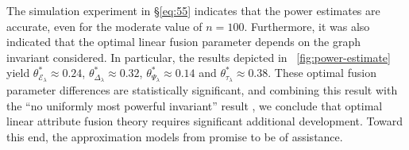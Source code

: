 \documentclass[10pt,journal,compsoc]{IEEEtran}
\theoremstyle{definition}
\begin{document}
The simulation experiment in \S \ref{eq:55} indicates that the power estimates
are accurate, even for the moderate value of $n = 100$. Furthermore,
it was also indicated that the optimal linear fusion parameter depends
on the graph invariant considered. In particular, the results depicted
in \figurename~\ref{fig:power-estimate} yield
$\theta^{*}_{\mathcal{E}_{\lambda}} \approx 0.24$,
$\theta^{*}_{\Delta_{\lambda}} \approx 0.32$,
$\theta^{*}_{\Psi_{\lambda}} \approx 0.14$ and
$\theta^{*}_{\tau_{\lambda}} \approx 0.38$. These optimal fusion
parameter differences are statistically significant, and combining
this result with the ``no uniformly most powerful invariant'' result
\cite{pao11:_statis_infer_random_graph}, we conclude that optimal
linear attribute fusion theory requires significant additional
development. Toward this end, the approximation models from
\cite{lee11} promise to be of assistance.
\end{document}

